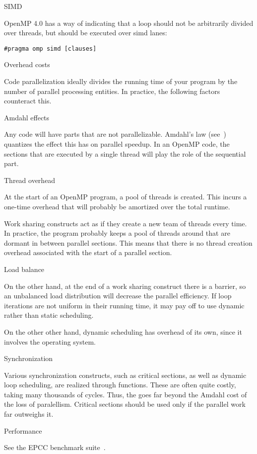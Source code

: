  {SIMD}

OpenMP 4.0 has a way of indicating that a loop should not
be arbitrarily divided over threads, but should be executed
over simd lanes:
\begin{verbatim}
#pragma omp simd [clauses]
\end{verbatim}

 {Overhead costs}

Code parallelization ideally divides the running time of your program
by the number of parallel processing entities. In practice, the following
factors counteract this.

 {Amdahl effects}

Any code will have parts that are not parallelizable. Amdahl's law
(see~) quantizes the effect this has on parallel speedup.
In an OpenMP code, the sections that are executed by a single thread
will play the role of the sequential part.

 {Thread overhead}

At the start of an OpenMP program, a pool of threads is created. This
incurs a one-time overhead that will probably be amortized over the
total runtime.

Work sharing constructs act as if they create a new team of threads every time.
In practice, the program probably keeps a pool of threads around that are dormant
in between parallel sections. This means that there is no thread creation overhead
associated with the start of a parallel section.

 {Load balance}

On the other hand, at the end of a work sharing construct there is a barrier,
so an unbalanced load distribution will decrease the parallel efficiency.
If loop iterations are not uniform in their running time, it may pay off
to use dynamic rather than static scheduling.

On the other other hand, dynamic scheduling has overhead of its own,
since it involves the operating system.

 {Synchronization}

Various synchronization constructs, such as critical sections, as well as
dynamic loop scheduling, are realized through 
functions. These are often quite costly, taking many thousands of cycles.
Thus, the  goes far beyond
the Amdahl cost of the loss of paralellism. Critical sections should be used only
if the parallel work far outweighs it.

 {Performance}

See the EPCC benchmark suite~\cite{epcc-ompbench}.

\endinput

\Level 0 {Idioms}

\Level 1 {While loops}

\verbatimsnippet{linkedlist}

